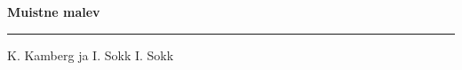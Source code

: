 \documentclass[10pt]{book}
\begin{document}
{
  \samepage
  \raggedbottom
  \raggedright
  \sloppy


  \vspace{0.2in}

  \noindent\begin{minipage}{.1\textwidth}
    \hfill\vspace{0.1in}
  \end{minipage}%
  \noindent\begin{minipage}{.8\textwidth}
    \centering
    \bfseries
    \large Muistne malev
  \end{minipage}%
  \noindent\begin{minipage}{.1\textwidth}
      \hfill\vspace{0.1in}
  \end{minipage}

  \nopagebreak[4]
  \vspace{0.1in}
  \nopagebreak[4]
  \hrule height 0.05ex
  \nopagebreak[4]
  \vspace{-0.05in}

  {\footnotesize K. Kamberg ja I. Sokk \hfill I. Sokk }\\
  \vspace{0.01in}



}
\end{document}
